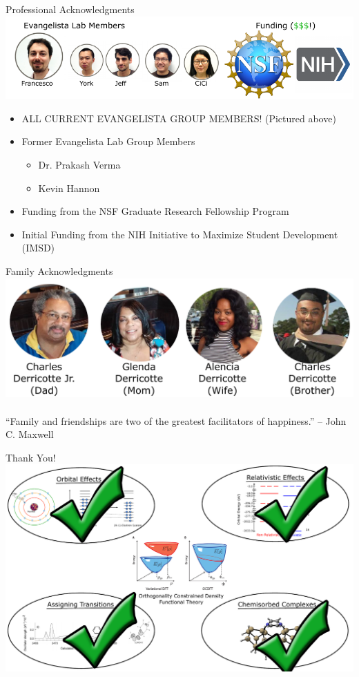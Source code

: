 \documentclass[t]{beamer}
\begin{document}
\begin{frame}{Professional Acknowledgments}
\includegraphics[width=\linewidth]{pro_acknow.pdf}
\begin{itemize}
\item ALL CURRENT EVANGELISTA GROUP MEMBERS! (Pictured above)
\item Former Evangelista Lab Group Members
		\begin{itemize}
		\item Dr. Prakash Verma
		\item Kevin Hannon
		\end{itemize}
\item Funding from the NSF Graduate Research Fellowship Program
\item Initial Funding from the NIH Initiative to Maximize Student Development (IMSD)
\end{itemize}
\end{frame}

\begin{frame}{Family Acknowledgments}
\includegraphics[width=\linewidth]{fam_acknow.pdf} \\ \\
``Family and friendships are two of the greatest facilitators of happiness.'' -- John C. Maxwell
\end{frame}

\begin{frame}{Thank You!}
\centering
\includegraphics[width=\linewidth]{project_intro__done.pdf}
\end{frame}
\end{document}

